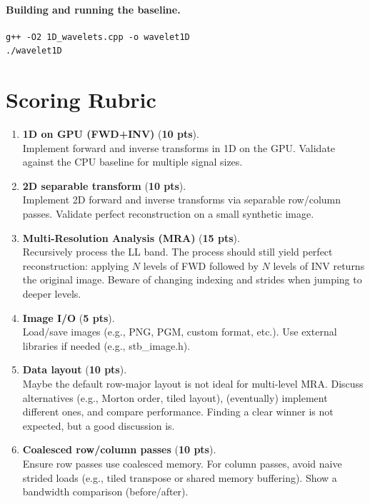 \documentclass[11pt]{article}
\newcommand{\term}[1]{\textbf{#1}}
\begin{document}
\paragraph{Building and running the baseline.}
\begin{verbatim}
g++ -O2 1D_wavelets.cpp -o wavelet1D
./wavelet1D
\end{verbatim}

\section*{Scoring Rubric}

\begin{enumerate}[leftmargin=1.5em]

  \item \term{1D on GPU (FWD+INV)} (\textbf{10 pts}).\\
  Implement forward and inverse transforms in 1D on the GPU.
  Validate against the CPU baseline for multiple signal sizes.

  \item \term{2D separable transform} (\textbf{10 pts}).\\
  Implement 2D forward and inverse transforms via separable row/column passes.
  Validate perfect reconstruction on a small synthetic image.

  \item \term{Multi-Resolution Analysis (MRA)} (\textbf{15 pts}).\\
  Recursively process the \textsf{LL} band.
  The process should still yield perfect reconstruction: applying $N$ levels of FWD followed by $N$ levels of INV returns the original image.
  Beware of changing indexing and strides when jumping to deeper levels.

  \item \term{Image I/O} (\textbf{5 pts}).\\
  Load/save images (e.g., PNG, PGM, custom format, etc.).
  Use external libraries if needed (e.g., stb\_image.h).

  \item \term{Data layout} (\textbf{10 pts}).\\
  Maybe the default row-major layout is not ideal for multi-level MRA.
  Discuss alternatives (e.g., Morton order, tiled layout), (eventually) implement different ones, and compare performance.
  Finding a clear winner is not expected, but a good discussion is.

  \item \term{Coalesced row/column passes} (\textbf{10 pts}).\\
  Ensure row passes use coalesced memory.
  For column passes, avoid naive strided loads (e.g., tiled transpose or shared memory buffering).
  Show a bandwidth comparison (before/after).


\end{enumerate}
\end{document}
